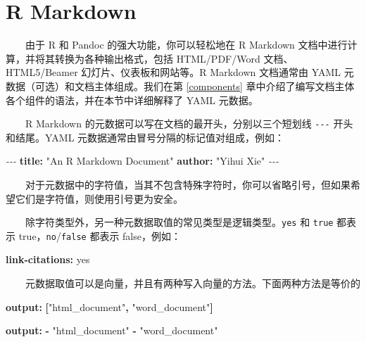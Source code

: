 \documentclass[
  12pt,
]{krantz}
\newenvironment{Shaded}{\begin{snugshade}}{\end{snugshade}}
\newcommand{\AttributeTok}[1]{\textcolor[rgb]{0.13,0.29,0.53}{#1}}
\newcommand{\CharTok}[1]{\textcolor[rgb]{0.31,0.60,0.02}{#1}}
\newcommand{\FunctionTok}[1]{\textcolor[rgb]{0.13,0.29,0.53}{\textbf{#1}}}
\newcommand{\KeywordTok}[1]{\textcolor[rgb]{0.13,0.29,0.53}{\textbf{#1}}}
\newcommand{\PreprocessorTok}[1]{\textcolor[rgb]{0.56,0.35,0.01}{\textit{#1}}}
\newcommand{\StringTok}[1]{\textcolor[rgb]{0.31,0.60,0.02}{#1}}
\theoremstyle{definition}
\theoremstyle{definition}
\theoremstyle{definition}
\theoremstyle{definition}
\theoremstyle{remark}
\begin{document}
\hypertarget{r-markdown}{%
\section{R Markdown}\label{r-markdown}}

  由于 R 和 Pandoc 的强大功能，你可以轻松地在 R Markdown 文档中进行计算，并将其转换为各种输出格式，包括 HTML/PDF/Word 文档、HTML5/Beamer 幻灯片、仪表板和网站等。R Markdown 文档通常由 YAML 元数据（可选）和文档主体组成。我们在第 \ref{components} 章中介绍了编写文档主体各个组件的语法，并在本节中详细解释了 YAML 元数据。

  R Markdown 的元数据可以写在文档的最开头，分别以三个短划线 \texttt{-\/-\/-} 开头和结尾。YAML 元数据通常由冒号分隔的标记值对组成，例如：

\begin{Shaded}
\begin{Highlighting}[]
\PreprocessorTok{{-}{-}{-}}
\FunctionTok{title}\KeywordTok{:}\AttributeTok{ }\StringTok{"An R Markdown Document"}
\FunctionTok{author}\KeywordTok{:}\AttributeTok{ }\StringTok{"Yihui Xie"}
\PreprocessorTok{{-}{-}{-}}
\end{Highlighting}
\end{Shaded}

  对于元数据中的字符值，当其不包含特殊字符时，你可以省略引号，但如果希望它们是字符值，则使用引号更为安全。

  除字符类型外，另一种元数据取值的常见类型是逻辑类型。\texttt{yes} 和 \texttt{true} 都表示 true，\texttt{no}/\texttt{false} 都表示 false，例如：

\begin{Shaded}
\begin{Highlighting}[]
\FunctionTok{link{-}citations}\KeywordTok{:}\AttributeTok{ }\CharTok{yes}
\end{Highlighting}
\end{Shaded}

  元数据取值可以是向量，并且有两种写入向量的方法。下面两种方法是等价的

\begin{Shaded}
\begin{Highlighting}[]
\FunctionTok{output}\KeywordTok{:}\AttributeTok{ }\KeywordTok{[}\StringTok{"html\_document"}\KeywordTok{,}\AttributeTok{ }\StringTok{"word\_document"}\KeywordTok{]}
\end{Highlighting}
\end{Shaded}

\begin{Shaded}
\begin{Highlighting}[]
\FunctionTok{output}\KeywordTok{:}
\AttributeTok{  }\KeywordTok{{-}}\AttributeTok{ }\StringTok{"html\_document"}
\AttributeTok{  }\KeywordTok{{-}}\AttributeTok{ }\StringTok{"word\_document"}
\end{Highlighting}
\end{Shaded}
\end{document}
